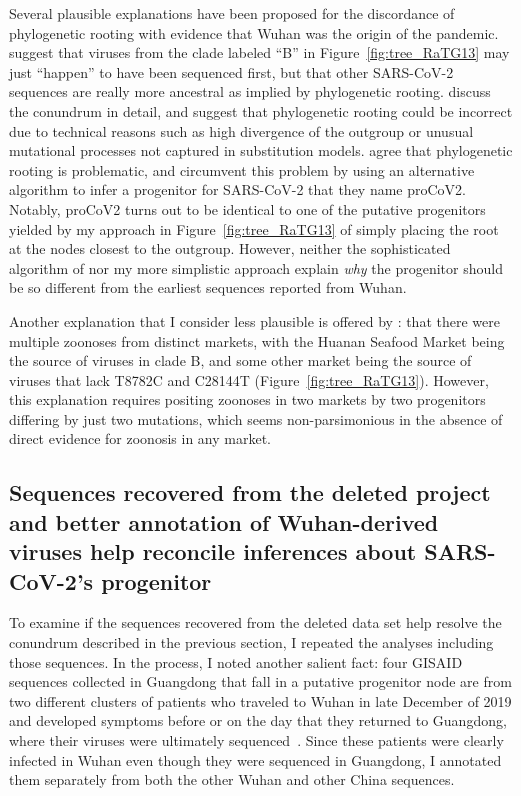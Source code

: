 \documentclass[9pt,twocolumn,twoside]{gsajnl_modified}
\begin{document}
Several plausible explanations have been proposed for the discordance of phylogenetic rooting with evidence that Wuhan was the origin of the pandemic.
\citet{rambaut2020dynamic} suggest that viruses from the clade labeled ``B'' in Figure~\ref{fig:tree_RaTG13} may just ``happen'' to have been sequenced first, but that other SARS-CoV-2 sequences are really more ancestral as implied by phylogenetic rooting.
\citet{pipes2021assessing} discuss the conundrum in detail, and suggest that phylogenetic rooting could be incorrect due to technical reasons such as high divergence of the outgroup or unusual mutational processes not captured in substitution models.
\citet{kumar2021evolutionary} agree that phylogenetic rooting is problematic, and circumvent this problem by using an alternative algorithm to infer a progenitor for SARS-CoV-2 that they name proCoV2.
Notably, proCoV2 turns out to be identical to one of the putative progenitors yielded by my approach in Figure~\ref{fig:tree_RaTG13} of simply placing the root at the nodes closest to the outgroup.
However, neither the sophisticated algorithm of \citet{kumar2021evolutionary} nor my more simplistic approach explain \emph{why} the progenitor should be so different from the earliest sequences reported from Wuhan.

Another explanation that I consider less plausible is offered by \citet{garry2021early}: that there were multiple zoonoses from distinct markets, with the Huanan Seafood Market being the source of viruses in clade B, and some other market being the source of viruses that lack T8782C and C28144T (Figure~\ref{fig:tree_RaTG13}).
However, this explanation requires positing zoonoses in two markets by two progenitors differing by just two mutations, which seems non-parsimonious in the absence of direct evidence for zoonosis in any market.

\subsection{Sequences recovered from the deleted project and better annotation of Wuhan-derived viruses help reconcile inferences about SARS-CoV-2's progenitor}
To examine if the sequences recovered from the deleted data set help resolve the conundrum described in the previous section, I repeated the analyses including those sequences.
In the process, I noted another salient fact: four GISAID sequences collected in Guangdong that fall in a putative progenitor node are from two different clusters of patients who traveled to Wuhan in late December of 2019 and developed symptoms before or on the day that they returned to Guangdong, where their viruses were ultimately sequenced~\citep{chan2020familial, kang2020evidence}.
Since these patients were clearly infected in Wuhan even though they were sequenced in Guangdong, I annotated them separately from both the other Wuhan and other China sequences.
\end{document}
